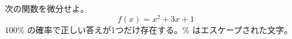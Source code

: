 \begin{problem}
次の関数を微分せよ。
\[
  f(x) = x^2 + 3x + 1
\]
100\% の確率で正しい答えが1つだけ存在する。\% はエスケープされた文字。
\end{problem}
